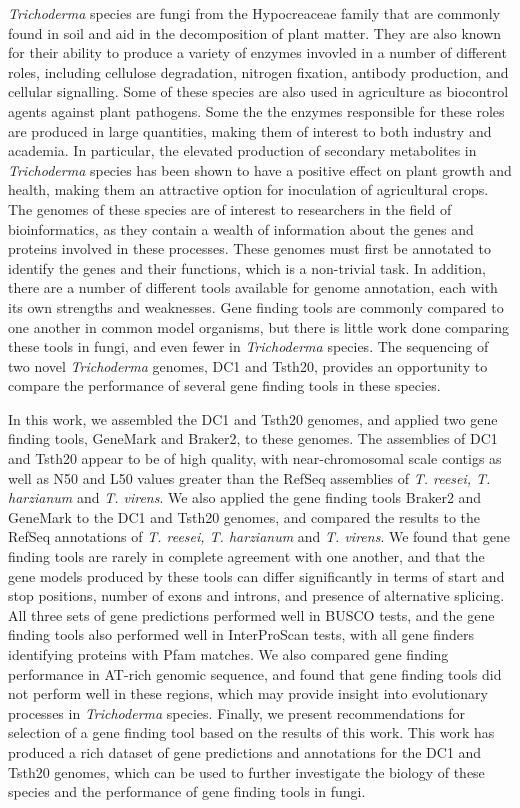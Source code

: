 \textit{Trichoderma} species are fungi from the Hypocreaceae family
 that are commonly found in soil and aid in the decomposition of plant matter.
 They are also known for their ability to produce a variety of enzymes invovled in a number of different roles, including cellulose degradation, nitrogen fixation, antibody production, and cellular signalling. Some of these species are also used in agriculture as biocontrol agents against plant pathogens. Some the the enzymes responsible for these roles are produced in large quantities, making them of interest to both industry and academia. In particular, the elevated production of secondary metabolites in \textit{Trichoderma} species has been shown to have a positive effect on plant growth and health, making them an attractive option for inoculation of agricultural crops. The genomes of these species are of interest to researchers in the field of bioinformatics, as they contain a wealth of information about the genes and proteins involved in these processes. These genomes must first be annotated to identify the genes and their functions, which is a non-trivial task. In addition, there are a number of different tools available for genome annotation, each with its own strengths and weaknesses. Gene finding tools are commonly compared to one another in common model organisms, but there is little work done comparing these tools in fungi, and even fewer in \textit{Trichoderma} species. The sequencing of two novel \textit{Trichoderma} genomes, DC1 and Tsth20, provides an opportunity to compare the performance of several gene finding tools in these species. 

 In this work, we assembled the DC1 and Tsth20 genomes, and applied two gene finding tools, GeneMark and Braker2, to these genomes. The assemblies of DC1 and Tsth20 appear to be of high quality, with near-chromosomal scale contigs as well as N50 and L50 values greater than the RefSeq assemblies of \textit{T. reesei, T. harzianum} and \textit{T. virens}. We also applied the gene finding tools Braker2 and GeneMark to the DC1 and Tsth20 genomes, and compared the results to the RefSeq annotations of \textit{T. reesei, T. harzianum} and \textit{T. virens}. We found that gene finding tools are rarely in complete agreement with one another, and that the gene models produced by these tools can differ significantly in terms of start and stop positions, number of exons and introns, and presence of alternative splicing. All three sets of gene predictions performed well in BUSCO tests, and the gene finding tools also performed well in InterProScan tests, with all gene finders identifying proteins with Pfam matches. We also compared gene finding performance in AT-rich genomic sequence, and found that gene finding tools did not perform well in these regions, which may provide insight into evolutionary processes in \textit{Trichoderma} species. Finally, we present recommendations for selection of a gene finding tool based on the results of this work. This work has produced a rich dataset of gene predictions and annotations for the DC1 and Tsth20 genomes, which can be used to further investigate the biology of these species and the performance of gene finding tools in fungi.